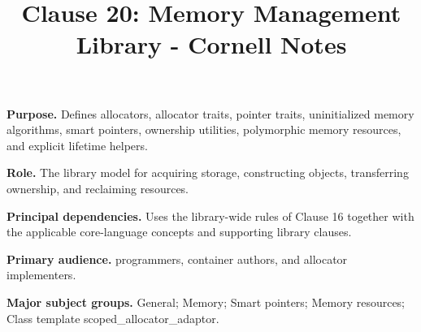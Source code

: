\documentclass[11pt,letterpaper]{article}
\title{Clause 20: Memory Management Library - Cornell Notes}
\author{}
\date{}
\begin{document}
\maketitle
\begin{CornellReferenceOrientationBox}
\textbf{Purpose.} Defines allocators, allocator traits, pointer traits, uninitialized memory algorithms, smart pointers, ownership utilities, polymorphic memory resources, and explicit lifetime helpers.
\par\textbf{Role.} The library model for acquiring storage, constructing objects, transferring ownership, and reclaiming resources.
\par\textbf{Principal dependencies.} Uses the library-wide rules of Clause 16 together with the applicable core-language concepts and supporting library clauses.
\par\textbf{Primary audience.} programmers, container authors, and allocator implementers.
\par\textbf{Major subject groups.} General; Memory; Smart pointers; Memory resources; Class template scoped\_\allowbreak{}allocator\_\allowbreak{}adaptor.
\end{CornellReferenceOrientationBox}
\end{document}
